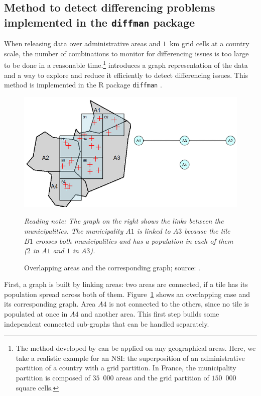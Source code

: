 \subsection{Method to detect differencing problems implemented in the \texttt{diffman} package} \label{sec:risk_diff_diffman}

When releasing data over administrative areas and $1$~km grid cells at a country scale,
the number of combinations to monitor for differencing issues is too large to be done in a reasonable time.\footnote{
    The method developed by \cite{Costemalle_2019} can be applied on any geographical areas. Here, we take a realistic example for an NSI: the superposition of an administrative partition of a country with a grid partition. In France, the municipality partition is composed of $35$~$000$ areas and the grid partition of $150$~$000$ square cells.}
\cite{Costemalle_2019} introduces a graph representation of the data and a way to explore and reduce it efficiently to detect differencing issues. This method is implemented in the R package \texttt{diffman} \citep{diffman}.

\begin{figure}[H]
\centering
\includegraphics[width=0.9\linewidth]{figures/Differencing_issues/to_graph.png}
\caption{Overlapping areas and the corresponding graph; source: \citet{Costemalle_2019}.}
\raggedright \textit{\footnotesize Reading note: The graph on the right shows the links between the municipalities. The municipality $A1$ is linked to $A3$ because the tile $B1$ crosses both municipalities and has a population in each of them ($2$ in $A1$ and $1$ in $A3$).}
\label{fig:graph_ex}
\end{figure}

First, a graph is built by linking areas: two areas are connected, if a tile has its population spread across both of them. Figure~\ref{fig:graph_ex} shows an overlapping case and its corresponding graph. Area $A4$ is not connected to the others, since no tile is populated at once in $A4$ and another area. This first step builds some independent connected sub-graphs that can be handled separately.

